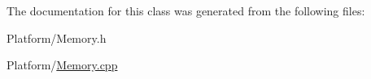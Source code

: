 The documentation for this class was generated from the following files\+:\begin{DoxyCompactItemize}
\item 
Platform/Memory.\+h\item 
Platform/\hyperlink{_memory_8cpp}{Memory.\+cpp}\end{DoxyCompactItemize}

